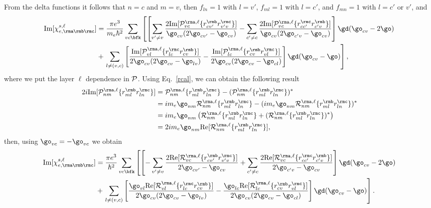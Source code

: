 From the delta functions it follows that $n=c$ and $m=v$, then
$f_{ln}=1$ with $l=v'$,
$f_{ml}=1$ with $l=c'$, 
and
$f_{mn}=1$ with $l=c'$ or $v'$, and
\begin{align}\label{imchie3}
\mathrm{Im}[\chi_{e,\rma\rmb\rmc}^{s,\ell}]
&=
\frac{\pi e^3}{m_e\hbar^2} 
\sum_{vc\bfk}
\left[
\left[
\sum_{v'\ne v}
\frac{2\mathrm{Im}[{\cal P}^{\rma,\ell}_{vc}\{r^{\rmb}_{cv'}r^{\rmc}_{v'v}\}]
}{\go_{cv}(2\go_{cv'}-\go_{cv})}
-
\sum_{c'\ne c}
\frac{2\mathrm{Im}[{\cal P}^{\rma,\ell}_{vc}\{r^{\rmc}_{cc'}r^{\rmb}_{c'v}\}]}
{\go_{cv}(2\go_{c'v}-\go_{cv})}
\right]
\gd(\go_{cv}-2\go)
\right.
\nonumber\\
&+
\left.
\sum_{l\neq(v,c)}
\left[
\frac{\mathrm{Im}[{\cal P}^{\rma,\ell}_{vl}\{r^{\rmc}_{lc}r^{\rmb}_{cv}\}]}
{2\go_{cv}(2\go_{cv}-\go_{lv})}
-
\frac{\mathrm{Im}[{\cal P}^{\rma,\ell}_{lc}\{r^{\rmb}_{cv}r^{\rmc}_{vl}\}]}
{2\go_{cv}(2\go_{cv}-\go_{cl})}
\right]
\gd(\go_{cv}-\go)
\right]
,
\end{align}  
where we put the layer $\ell$ dependence in ${\cal P}$.
Using Eq.~\eqref{rcal}, we can obtain the following result
\begin{align}\label{ptor}
2i\mathrm{Im}[{\cal P}^{\rma,\ell}_{nm}\{r^{\rmb}_{ml}r^{\rmc}_{ln}\}]
&=
{\cal P}^{\rma,\ell}_{nm}\{r^{\rmb}_{ml}r^{\rmc}_{ln}\}
-
({\cal P}^{\rma,\ell}_{nm}\{r^{\rmb}_{ml}r^{\rmc}_{ln}\})^*
\nonumber\\
&=
im_e\go_{nm}{\cal R}^{\rma,\ell}_{nm}\{r^{\rmb}_{ml}r^{\rmc}_{ln}\}
-
(im_e\go_{nm}{\cal R}^{\rma,\ell}_{nm}\{r^{\rmb}_{ml}r^{\rmc}_{ln}\})^*
\nonumber\\
&=
im_e\go_{nm}\left({\cal R}^{\rma,\ell}_{nm}\{r^{\rmb}_{ml}r^{\rmc}_{ln}\}
+
({\cal R}^{\rma,\ell}_{nm}\{r^{\rmb}_{ml}r^{\rmc}_{ln}\})^*
\right)
\nonumber\\
&=
2im_e\go_{nm}\mathrm{Re}[{\cal R}^{\rma,\ell}_{nm}\{r^{\rmb}_{ml}r^{\rmc}_{ln}\}]
,
\end{align}
then, using $\go_{vc}=-\go_{vc}$ we obtain
\begin{align}\label{imchie3n}
\mathrm{Im}[\chi_{e,\rma\rmb\rmc}^{s,\ell}]
&=
\frac{\pi e^3}{\hbar^2} 
\sum_{vc\bfk}
\left[
\left[
-\sum_{v'\ne v}
\frac{2\mathrm{Re}[{\cal R}^{\rma,\ell}_{vc}\{r^{\rmb}_{cv'}r^{\rmc}_{v'v}\}]
}{2\go_{cv'}-\go_{cv}}
+
\sum_{c'\ne c}
\frac{2\mathrm{Re}[{\cal R}^{\rma,\ell}_{vc}\{r^{\rmc}_{cc'}r^{\rmb}_{c'v}\}]}
{2\go_{c'v}-\go_{cv}}
\right]
\gd(\go_{cv}-2\go)
\right.
\nonumber\\
&+
\left.
\sum_{l\neq(v,c)}
\left[
\frac{\go_{vl}\mathrm{Re}[{\cal R}^{\rma,\ell}_{vl}\{r^{\rmc}_{lc}r^{\rmb}_{cv}\}]}
{2\go_{cv}(2\go_{cv}-\go_{lv})}
-
\frac{\go_{lc}\mathrm{Re}[{\cal R}^{\rma,\ell}_{lc}\{r^{\rmb}_{cv}r^{\rmc}_{vl}\}]}
{2\go_{cv}(2\go_{cv}-\go_{cl})}
\right]
\gd(\go_{cv}-\go)
\right]
.
\end{align}  
